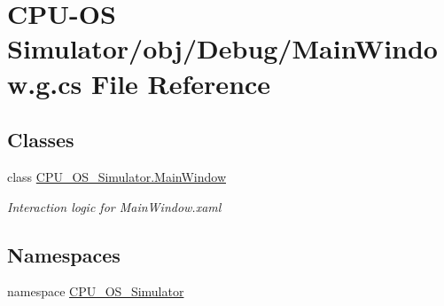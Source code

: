 \hypertarget{_c_p_u-_o_s_01_simulator_2obj_2_debug_2_main_window_8g_8cs}{}\section{C\+P\+U-\/\+O\+S Simulator/obj/\+Debug/\+Main\+Window.g.\+cs File Reference}
\label{_c_p_u-_o_s_01_simulator_2obj_2_debug_2_main_window_8g_8cs}
\subsection*{Classes}
\begin{DoxyCompactItemize}
\item 
class \hyperlink{class_c_p_u___o_s___simulator_1_1_main_window}{C\+P\+U\+\_\+\+O\+S\+\_\+\+Simulator.\+Main\+Window}
\begin{DoxyCompactList}\small\item\em Interaction logic for Main\+Window.\+xaml \end{DoxyCompactList}\end{DoxyCompactItemize}
\subsection*{Namespaces}
\begin{DoxyCompactItemize}
\item 
namespace \hyperlink{namespace_c_p_u___o_s___simulator}{C\+P\+U\+\_\+\+O\+S\+\_\+\+Simulator}
\end{DoxyCompactItemize}
